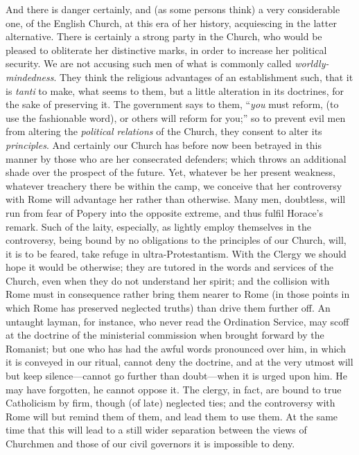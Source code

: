 And there
is danger certainly, and (as some persons think) a very considerable
one, of the English Church, at this era of her history, acquiescing in
the latter alternative. There is certainly a strong party in the Church,
who would be pleased to obliterate her distinctive marks, in order to
increase her political security. We are not accusing such men of what is
commonly called \emph{worldly-mindedness}. They think the religious
advantages of an establishment such, that it is \emph{tanti} to make,
what seems to them, but a little alteration in its doctrines, for the
sake of preserving it. The government says to them, ``\emph{you} must
reform, (to use the fashionable word), or others will reform for you;''
so to prevent evil men from altering the \emph{political relations} of
the Church, they consent to alter its \emph{principles}. And certainly
our Church has before now been betrayed in this manner by those who are
her consecrated defenders; which throws an additional shade over the
prospect of the future. Yet, whatever be her present weakness, whatever
treachery there be within the camp, we conceive that her controversy
with Rome will advantage her rather than otherwise. Many men, doubtless,
will run from fear of Popery into the opposite extreme, and thus fulfil
Horace's remark. Such of the laity, especially, as lightly employ
themselves in the controversy, being bound by no obligations to the
principles of our Church, will, it is to be feared, take refuge in
ultra-Protestantism. With the Clergy we should hope it would be
otherwise; they are tutored in the words and services of the Church,
even when they do not understand her spirit; and the collision with Rome
must in consequence rather bring them nearer to Rome (in those points in
which Rome has preserved neglected truths) than drive them further off.
An untaught layman, for instance, who never read the Ordination Service,
may scoff at the doctrine of the ministerial commission when brought
forward by the Romanist; but one who has had the awful words pronounced
over him, in which it is conveyed in our ritual, cannot deny the
doctrine, and at the very utmost will but keep silence—cannot go
further than doubt—when it is urged upon him. He may have forgotten,
he cannot oppose it. The clergy, in fact, are bound to true Catholicism
by firm, though (of late) neglected ties; and the controversy with Rome
will but remind them of them, and lead them to use them. At the same
time that this will lead to a still wider separation between the views
of Churchmen and those of our civil governors it is impossible to deny.


